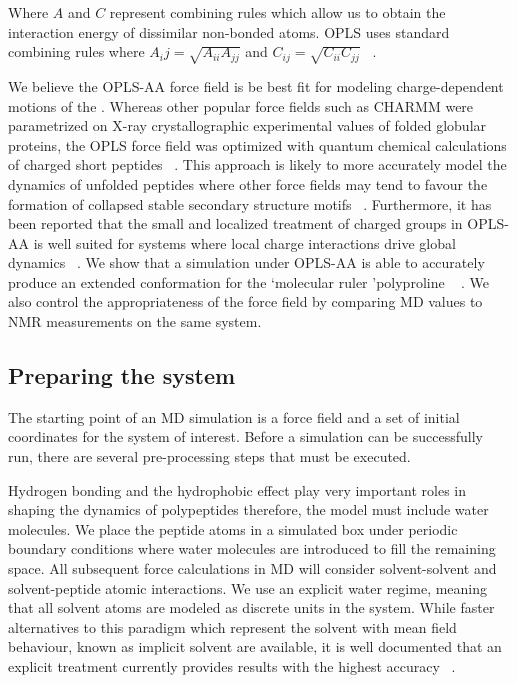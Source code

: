 Where $A$ and $C$ represent combining rules which allow us to obtain the interaction energy of dissimilar non-bonded atoms. OPLS uses standard combining rules where $A_ij = \sqrt{A_{ii}A_{jj}}$ and $C_{ij} = \sqrt{C_{ii}C_{jj}}$ ~\cite{good1970new}.

We believe the OPLS-AA force field is be best fit for modeling charge-dependent motions of the \gct. Whereas other popular force fields such as CHARMM were parametrized on X-ray crystallographic experimental values of folded globular proteins, the OPLS force field was optimized with quantum chemical calculations of charged short peptides ~\cite{kukol2008molecular}. This approach is likely to more accurately model the dynamics of unfolded peptides where other force fields may tend to favour the formation of collapsed stable secondary structure motifs ~\cite{henriques2015molecular, tran2008role}. Furthermore, it has been reported that the small and localized treatment of charged groups in OPLS-AA is well suited for systems where local charge interactions drive global dynamics ~\cite{vitalis2009absinth}. We show that a simulation under OPLS-AA is able to accurately produce an extended conformation for the \lq molecular ruler \rq polyproline ~\cite{schuler2005polyproline} . We also control the appropriateness of the force field by comparing MD values to NMR measurements on the same system.



\subsection{Preparing the system}

The starting point of an MD simulation is a force field and a set of initial coordinates for the system of interest. Before a simulation can be successfully run, there are several pre-processing steps that must be executed. 

Hydrogen bonding and the hydrophobic effect play very important roles in shaping the dynamics of polypeptides therefore, the model must include water molecules. We place the peptide atoms in a simulated box under periodic boundary conditions where water molecules are introduced to fill the remaining space. All subsequent force calculations in MD will consider solvent-solvent and solvent-peptide atomic interactions. We use an explicit water regime, meaning that all solvent atoms are modeled as discrete units in the system. While faster alternatives to this paradigm which represent the solvent with mean field behaviour, known as implicit solvent are available, it is well documented that an explicit treatment currently provides results with the highest accuracy ~\cite{onufriev2008implicit, arnold1994evaluation, zhou2003free}. 

